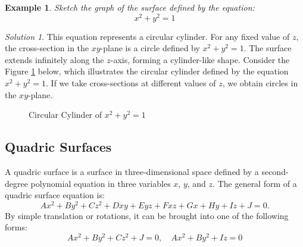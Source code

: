 \documentclass{book}
\newtheorem{example}{Example}[chapter]
\theoremstyle{remark}
\newtheorem*{solution}{Solution}
\begin{document}
\begin{example}
    Sketch the graph of the surface defined by the equation:
    \[
        x^2 + y^2 = 1
    \]
\end{example}
\begin{solution}
    This equation represents a circular cylinder. For any fixed value of $z$, the cross-section in the $xy$-plane is a circle defined by $x^2 + y^2 = 1$. The surface extends infinitely along the $z$-axis, forming a cylinder-like shape. Consider the Figure \ref{fig:circular_cylinder} below, which illustrates the circular cylinder defined by the equation $x^2 + y^2 = 1$. If we take cross-sections at different values of $z$, we obtain circles in the $xy$-plane.
\end{solution}

\begin{figure}[h]
    \centering
    \caption{Circular Cylinder of $x^2 + y^2 = 1$}\label{fig:circular_cylinder}
\end{figure}

\subsection{Quadric Surfaces}
A quadric surface is a surface in three-dimensional space defined by a second-degree polynomial equation in three variables $x$, $y$, and $z$. The general form of a quadric surface equation is:
\[
    Ax^2 + By^2 + Cz^2 + Dxy + Eyz + Fxz + Gx + Hy + Iz + J = 0.
\]
By simple translation or rotations, it can be brought into one of the following forms:
\[
    Ax^2 + By^2 + Cz^2 + J = 0, \quad Ax^2 + By^2 + Iz = 0
\]
\end{document}
